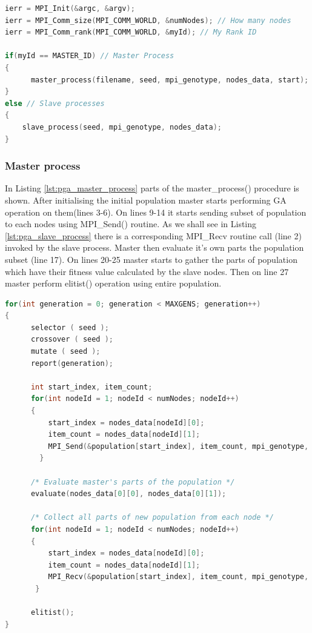 \begin{lstlisting}[language=C, caption={Master and slave pr}, label={lst:pga_mpi_main}]
ierr = MPI_Init(&argc, &argv);
ierr = MPI_Comm_size(MPI_COMM_WORLD, &numNodes); // How many nodes
ierr = MPI_Comm_rank(MPI_COMM_WORLD, &myId); // My Rank ID
    
if(myId == MASTER_ID) // Master Process
{
      master_process(filename, seed, mpi_genotype, nodes_data, start);
}
else // Slave processes
{  
    slave_process(seed, mpi_genotype, nodes_data);
}
\end{lstlisting}

\subsubsection{Master process}
In Listing \ref{lst:pga_master_process} parts of the master\_process() procedure is shown. After initialising the initial population master starts performing GA operation on them(lines 3-6). On lines 9-14 it starts sending subset of population to each nodes using MPI\_Send() routine. As we shall see in Listing \ref{lst:pga_slave_process} there is a corresponding MPI\_Recv routine call (line 2) invoked by the slave process. Master then evaluate it's own parts the population subset (line 17). On lines 20-25 master starts to gather the parts of population which have their fitness value calculated by the slave nodes. Then on line 27 master perform elitist() operation using entire population.

\begin{lstlisting}[language=C, caption={The master\_process() procedure.}, label={lst:pga_master_process}]
for(int generation = 0; generation < MAXGENS; generation++)
{   
      selector ( seed );
      crossover ( seed );
      mutate ( seed );     
      report(generation);

      int start_index, item_count;
      for(int nodeId = 1; nodeId < numNodes; nodeId++)
      {
          start_index = nodes_data[nodeId][0];
          item_count = nodes_data[nodeId][1];
          MPI_Send(&population[start_index], item_count, mpi_genotype, nodeId, SEND_DATA_TAG, MPI_COMM_WORLD);
        }
        
      /* Evaluate master's parts of the population */
      evaluate(nodes_data[0][0], nodes_data[0][1]);
        
      /* Collect all parts of new population from each node */
      for(int nodeId = 1; nodeId < numNodes; nodeId++)
      {
          start_index = nodes_data[nodeId][0];
          item_count = nodes_data[nodeId][1];
          MPI_Recv(&population[start_index], item_count, mpi_genotype, nodeId, RETN_DATA_TAG, MPI_COMM_WORLD, &status);
       }
                
      elitist();
}
\end{lstlisting}

